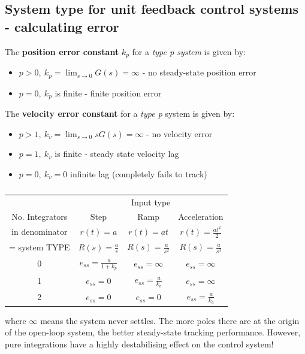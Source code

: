 \documentclass[class=report, crop=false, 12pt,a4paper]{standalone}
\begin{document}
\subsection{System type for unit feedback control systems - calculating error}
The \textbf{position error constant} $k_p$ for a \textit{type p system} is given by: 
\begin{itemize}
  \item $p > 0, \ k_p = \lim_{s\rightarrow 0} G(s) = \infty$ - no steady-state position error
  \item $p=0, \ k_p$ is finite - finite position error
\end{itemize}
The \textbf{velocity error constant} for a \textit{type p} system is given by:
\begin{itemize}
  \item $p> 1, \ k_v = \lim_{s\rightarrow 0} sG(s) = \infty$ - no velocity error
  \item $p = 1, \ k_v$ is finite - steady state velocity lag
  \item $p = 0, \ k_v = 0$ infinite lag (completely fails to track) 
\end{itemize}
\begin{table}[H]
  \begin{center}
  \begin{tabular}{|c|c|c|c|}
    \hline
    & \multicolumn{3}{c|}{Input type}\\
    \cline{2-4}
    No. Integrators & Step & Ramp & Acceleration\\
    in denominator & $r(t) = a$ & $r(t) = at$ & $r(t) = \frac{at^2}{2}$\\
    = system TYPE & $R(s) = \frac{a}{s}$ & $R(s) = \frac{a}{s^2}$ & $R(s) = \frac{a}{s^3}$\\
    \hline
    \hline
    0 & $e_{ss} = \frac{a}{1+k_p}$ & $e_{ss} = \infty$ & $e_{ss} = \infty$\\
    \hline
    1 & $e_{ss} = 0$ & $e_{ss} = \frac{a}{k_v}$ & $e_{ss} = \infty$\\
    \hline
    2 & $e_{ss} = 0$ & $e_{ss} = 0$ & $e_{ss} = \frac{a}{k_a}$\\
    \hline
  \end{tabular}
  \end{center}
  \caption{}
\end{table}
where $\infty$ means the system never settles. The more poles there are at the origin of the open-loop system, the better steady-state tracking performance. However, pure integrations have a highly destabilising effect on the control system!
\end{document}
